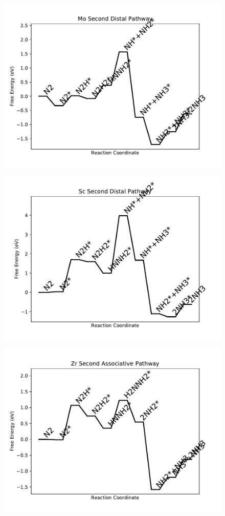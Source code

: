 \begin{figure}
\includegraphics[width=0.8\linewidth]{data/plots/Mo_distal_2.pdf}
\label{fig:Mo_distal_2}
\end{figure}

\begin{figure}
\includegraphics[width=0.8\linewidth]{data/plots/Sc_distal_2.pdf}
\label{fig:Sc_distal_2}
\end{figure}

\begin{figure}
\includegraphics[width=0.8\linewidth]{data/plots/Zr_associative_2.pdf}
\label{fig:Zr_associative_2}
\end{figure}

